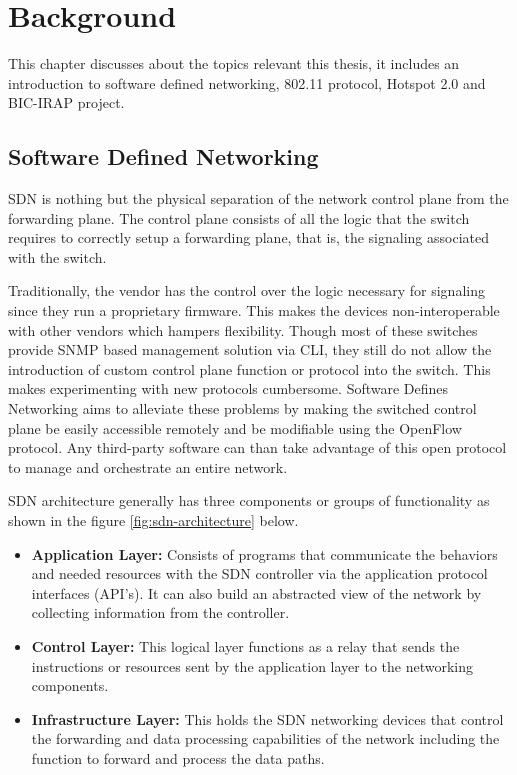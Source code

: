 
\chapter{Background}\label{ch:Background}
\sffamily{}

This chapter discusses about the topics relevant this thesis, it includes an introduction to software defined networking, 802.11 protocol, Hotspot 2.0 and BIC-IRAP project.

\section{Software Defined Networking \cite{SDN}}\label{sec:SDN}

SDN is nothing but the physical separation of the network control plane from the forwarding plane. The control plane consists of all the logic that the switch requires to correctly setup a forwarding plane, that is, the signaling associated with the switch.

Traditionally, the vendor has the control over the logic necessary for signaling since they run a proprietary firmware. This makes the devices non-interoperable with other vendors which hampers flexibility. Though most of these switches provide SNMP based management solution via CLI, they still do not allow the introduction of custom control plane function or protocol into the switch. This makes experimenting with new protocols cumbersome. Software Defines Networking aims to alleviate these problems by making the switched control plane be easily accessible remotely and be modifiable using the OpenFlow protocol. Any third-party software can than take advantage of this open protocol to manage and orchestrate an entire network.

SDN architecture generally has three components or groups of functionality as shown in the figure \ref{fig:sdn-architecture} below.

\begin{itemize}
	\item \textbf{Application Layer:}  Consists of programs that communicate the behaviors and needed resources with the SDN controller via the application protocol interfaces (API’s). It can also build an abstracted view of the network by collecting information from the controller.
	\item \textbf{Control Layer:} This logical layer functions as a relay that sends the instructions or resources sent by the application layer to the networking components.
	\item \textbf{Infrastructure Layer:} This holds the SDN networking devices that control the forwarding and data processing capabilities of the network including the function to forward and process the data paths.
\end{itemize}


